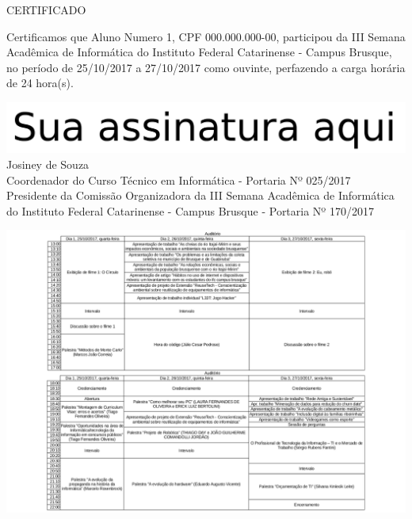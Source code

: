 \documentclass{abnt}
\begin{document}
\BgThispage
\color{black}
\bf
\begin{center}
    \Huge{CERTIFICADO}
\end{center}

Certificamos que Aluno Numero 1, CPF 000.000.000-00, participou da III Semana Acadêmica de Informática do Instituto Federal Catarinense - Campus Brusque, no período de
25/10/2017 a 27/10/2017 como ouvinte, perfazendo a carga horária de 24 hora(s).


\begin{center}
\includegraphics[scale=0.2]{../assinatura-pb.png}\\
Josiney de Souza\\
Coordenador do Curso Técnico em Informática - Portaria Nº 025/2017\\
Presidente da Comissão Organizadora da III Semana Acadêmica de Informática do Instituto Federal Catarinense - Campus Brusque - Portaria Nº 170/2017
\end{center}

\newpage
{}

\includegraphics[scale=0.85]{../juncao-grades.png}
\end{document}
